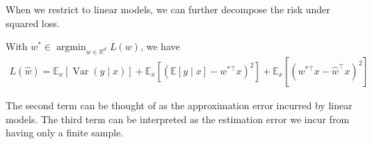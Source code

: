 \documentclass{article}
\begin{document}
When we restrict to linear models, we can further decompose the risk under squared loss.
\begin{lema}
 With $w^{*} \in \operatorname{argmin}_{w \in \mathbb{R}^{d}} L(w)$, we have
\begin{align*}
L(\hat{w})=\mathbb{E}_{x}[\operatorname{Var}(y \mid x)]+\mathbb{E}_{x}\left[\left(\mathbb{E}[y \mid x]-w^{* \top} x\right)^{2}\right]+\mathbb{E}_{x}\left[\left(w^{* \top} x-\hat{w}^{\top} x\right)^{2}\right]
\end{align*}
\end{lema}
\begin{rema}
The second term can be thought of as the approximation error incurred by linear models. The third term can be interpreted as the estimation error we incur from having only a finite sample.
\end{rema}
\end{document}
